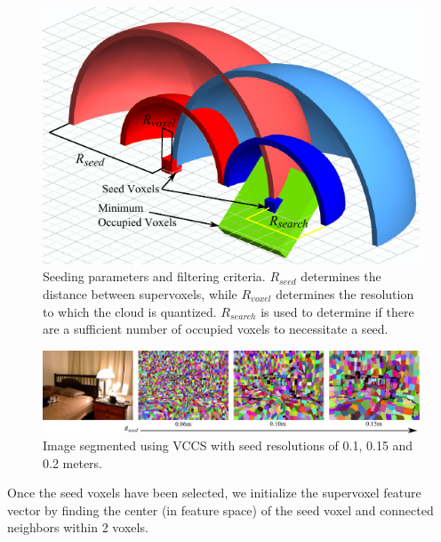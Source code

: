 \begin{figure}[t]
\begin{center}
\includegraphics[width=0.9\linewidth]{figures/CVPR2013/MinimumOccupied.pdf}
\end{center}
   \caption[Seeding Parameters]{Seeding parameters and filtering criteria. ${R}_{seed}$ determines the distance between supervoxels, while ${R}_{voxel}$ determines the resolution to which the cloud is quantized. ${R}_{search}$ is used to determine if there are a sufficient number of occupied voxels to necessitate a seed. }
\label{fig:SeedingDiagram}
\end{figure}
\begin{figure}
\begin{center}
\includegraphics[width=1.0\linewidth]{figures/CVPR2013/IncreasingSeedSize.pdf}
\end{center}
   \caption[Seeding Size]{Image segmented using VCCS with seed resolutions of 0.1, 0.15 and 0.2 meters.}
\label{fig:SegmentedDiffSeeds}
\end{figure}
Once the seed voxels have been selected, we initialize the supervoxel feature vector by finding the center (in feature space) of the seed voxel and connected neighbors within 2 voxels. 

